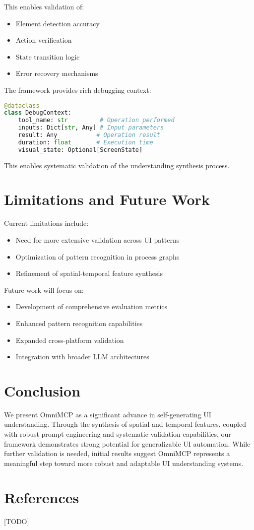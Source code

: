 \documentclass{article}
\begin{document}
This enables validation of:
\begin{itemize}
    \item Element detection accuracy
    \item Action verification
    \item State transition logic
    \item Error recovery mechanisms
\end{itemize}

The framework provides rich debugging context:

\begin{lstlisting}[language=Python]
@dataclass
class DebugContext:
    tool_name: str         # Operation performed
    inputs: Dict[str, Any] # Input parameters
    result: Any           # Operation result
    duration: float       # Execution time
    visual_state: Optional[ScreenState]
\end{lstlisting}

This enables systematic validation of the understanding synthesis process.

\section{Limitations and Future Work}
Current limitations include:
\begin{itemize}
    \item Need for more extensive validation across UI patterns
    \item Optimization of pattern recognition in process graphs
    \item Refinement of spatial-temporal feature synthesis
\end{itemize}

Future work will focus on:
\begin{itemize}
    \item Development of comprehensive evaluation metrics
    \item Enhanced pattern recognition capabilities
    \item Expanded cross-platform validation
    \item Integration with broader LLM architectures
\end{itemize}

\section{Conclusion}
We present OmniMCP as a significant advance in self-generating UI understanding. Through the synthesis of spatial and temporal features, coupled with robust prompt engineering and systematic validation capabilities, our framework demonstrates strong potential for generalizable UI automation. While further validation is needed, initial results suggest OmniMCP represents a meaningful step toward more robust and adaptable UI understanding systems.

\section{References}
[TODO]
\end{document}
